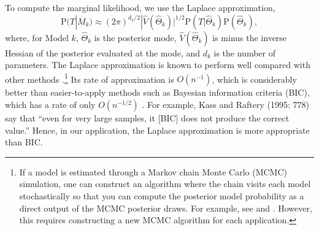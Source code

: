 \documentclass[11pt,titlepage]{article}
\renewcommand{\P}{\text{P}}
\begin{document}
To compute the marginal likelihood, we use the Laplace approximation,
\begin{equation}
  \P(T|M_k) \approx (2 \pi)^{{d_k}/2}|\widehat V(\hat\Theta_k)|^{1/2}
  \P(T|\hat{\Theta}_k) \P(\hat{\Theta}_k),
\end{equation}
where, for Model $k$, $\hat{\Theta}_k$ is the posterior mode, $\hat
V(\hat\Theta_k)$ is minus the inverse Hessian of the posterior
evaluated at the mode, and $d_k$ is the number of parameters.  The
Laplace approximation is known to perform well compared with other
methods
\citep{raft:96,lewi:raft:97,dici:kass:raft:wass:97}.\footnote{If a
  model is estimated through a Markov chain Monte Carlo (MCMC)
  simulation, one can construct an algorithm where the chain visits
  each model stochastically so that you can compute the posterior
  model probability as a direct output of the MCMC posterior draws.
  For example, see \citet{carl:chib:95} and \citet{geor:mccu:93}.
  However, this requires constructing a new MCMC algorithm for each
  application.}  Its rate of approximation is $O(n^{-1})$, which is
considerably better than easier-to-apply methods such as Bayesian
information criteria (BIC), which has a rate of only $O(n^{-1/2})$
\citep{kass:tier:kada:89}.  For example, Kass and Raftery (1995: 778)
say that ``even for very large samples, it [BIC] does not produce the
correct value.''  Hence, in our application, the Laplace approximation
is more appropriate than BIC.

\singlespacing

% 

\end{document}

